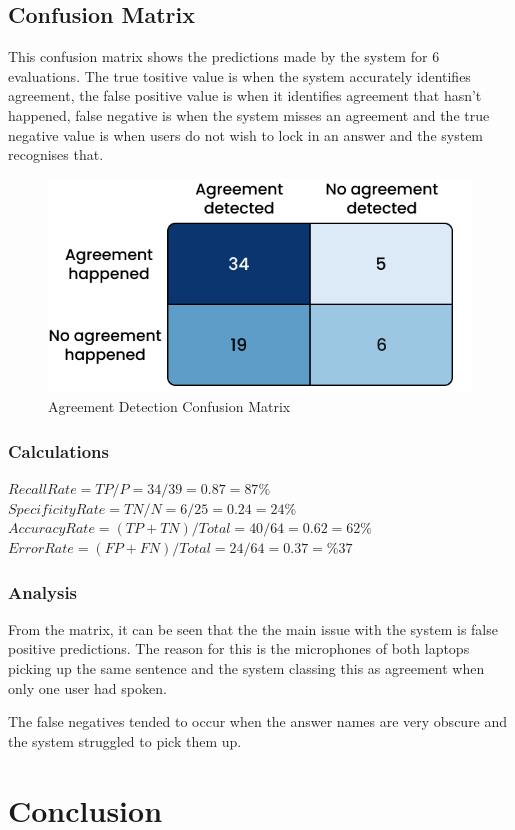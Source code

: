 \documentclass[hidelinks, 11pt]{article}
\begin{document}
\subsection{Confusion Matrix}
This confusion matrix shows the predictions made by the system for 6 evaluations. The true tositive value is when the system accurately identifies agreement, the false positive value is when it identifies agreement that hasn't happened, false negative is when the system misses an agreement and the true negative value is when users do not wish to lock in an answer and the system recognises that.
\begin{figure}[!ht]
  \centering
  \includegraphics[width=\columnwidth]{images/agreement_confusion_matrix.png}
  \caption{Agreement Detection Confusion Matrix}
\end{figure}
\subsubsection{Calculations}
$Recall Rate = TP / P = 34 / 39 = 0.87 = 87\%$
$Specificity Rate = TN / N = 6 / 25 = 0.24 = 24\%$
$Accuracy Rate = (TP + TN) / Total = 40 / 64 = 0.62 = 62\%$
$Error Rate = (FP + FN) / Total = 24 / 64 = 0.37 = \%37$
\subsubsection{Analysis}
From the matrix, it can be seen that the the main issue with the system is false positive predictions. The reason for this is the microphones of both laptops picking up the same sentence and the system classing this as agreement when only one user had spoken.

The false negatives tended to occur when the answer names are very obscure and the system struggled to pick them up.

\section{Conclusion}
\label{sec:conclusion}
\end{document}
